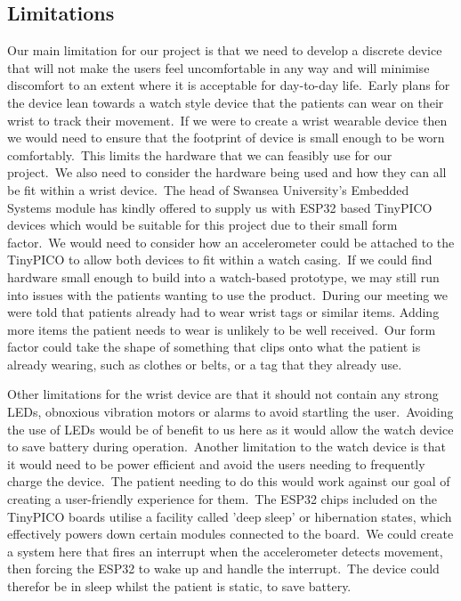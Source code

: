         \subsection{Limitations}
            Our main limitation for our project is that we need to develop a discrete device that will not make the
            users feel uncomfortable in any way and will minimise discomfort to an extent where it is
            acceptable for day-to-day life.\ Early plans for the device lean towards a watch style device that the
            patients can wear on their wrist to track their movement.\ If we were to create a wrist wearable device
            then we would need to ensure that the footprint of device is small enough to be worn comfortably.\ This limits
            the hardware that we can feasibly use for our project.\ We also need to consider the hardware being
            used and how they can all be fit within a wrist device.\ The head of Swansea University’s Embedded Systems
            module has kindly offered to supply us with ESP32 based TinyPICO devices which would be suitable for this
            project due to their small form factor.\ We would need to consider how an accelerometer could be attached to
            the TinyPICO to allow both devices to fit within a watch casing.\ If we could find hardware small
            enough to build into a watch-based prototype, we may still run into issues with the patients wanting to use
            the product.\ During our meeting we were told that patients already had to wear wrist tags or similar items.
            Adding more items the patient needs to wear is unlikely to be well received.\ Our form factor could take the
            shape of something that clips onto what the patient is already wearing, such as clothes or belts, or a tag
            that they already use.

            Other limitations for the wrist device are that it should not contain any strong LEDs, obnoxious vibration
            motors or alarms to avoid startling the user.\ Avoiding the use of LEDs would be of benefit to us here as it
            would allow the watch device to save battery during operation.\ Another limitation to the watch device is
            that it would need to be power efficient and avoid the users needing to frequently charge the device.\ The
            patient needing to do this would work against our goal of creating a user-friendly experience for them.\ The
            ESP32 chips included on the TinyPICO boards utilise a facility called 'deep sleep' or hibernation states,
            which effectively powers down certain modules connected to the board.\ We could create a system here that
            fires an interrupt when the accelerometer detects movement, then forcing the ESP32 to wake up and handle the
            interrupt.\ The device could therefor be in sleep whilst the patient is static, to save battery.

